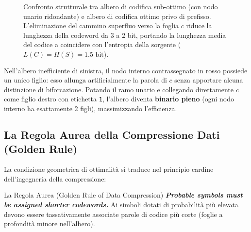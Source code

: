 \begin{figure}[H]
\caption{Confronto strutturale tra albero di codifica sub-ottimo (con nodo unario ridondante) e albero di codifica ottimo privo di prefisso. L'eliminazione del cammino superfluo verso la foglia $c$ riduce la lunghezza della codeword da 3 a 2 bit, portando la lunghezza media del codice a coincidere con l'entropia della sorgente ($L(C) = H(S) = 1.5\text{ bit}$).}
\label{fig:confronto-alberi-codifica}
\end{figure}

Nell'albero inefficiente di sinistra, il nodo interno contrassegnato in rosso possiede un unico figlio: esso allunga artificialmente la parola di $c$ senza apportare alcuna distinzione di biforcazione. Potando il ramo unario e collegando direttamente $c$ come figlio destro con etichetta \texttt{1}, l'albero diventa \textbf{binario pieno} (ogni nodo interno ha esattamente 2 figli), massimizzando l'efficienza.

\FloatBarrier
\subsection{La Regola Aurea della Compressione Dati (Golden Rule)}
\label{subsec:regola-aurea}

La condizione geometrica di ottimalit\`a si traduce nel principio cardine dell'ingegneria della compressione:

\begin{alertblock}{La Regola Aurea (Golden Rule of Data Compression)}
\centering
\Large \textbf{\textit{Probable symbols must be assigned shorter codewords.}}
\normalsize \vskip 0.2cm
Ai simboli dotati di probabilit\`a pi\`u elevata devono essere tassativamente associate parole di codice pi\`u corte (foglie a profondit\`a minore nell'albero).
\end{alertblock}

